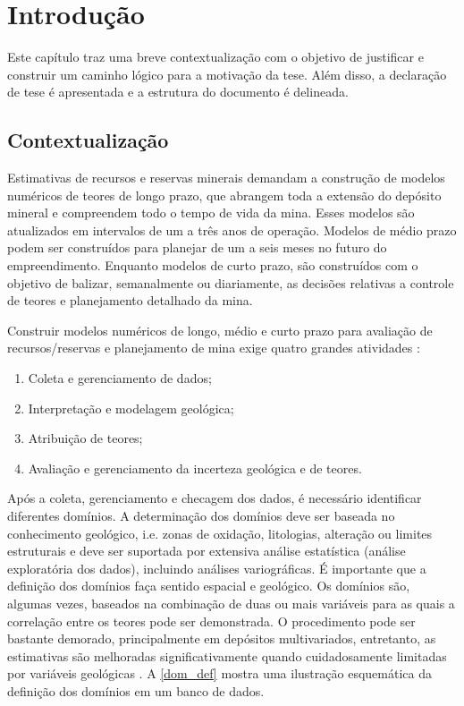 \chapter{Introdução}

Este capítulo traz uma breve contextualização com o objetivo de justificar e construir um caminho lógico para a motivação da tese. Além disso, a declaração de tese é apresentada e a estrutura do documento é delineada.

\section{Contextualização}

Estimativas de recursos e reservas minerais demandam a construção de modelos numéricos de teores de longo prazo, que abrangem toda a extensão do depósito mineral e compreendem todo o tempo de vida da mina. Esses modelos são atualizados em intervalos de um a três anos de operação. Modelos de médio prazo podem ser construídos para planejar de um a seis meses no futuro do empreendimento. Enquanto modelos de curto prazo, são construídos com o objetivo de balizar, semanalmente ou diariamente, as decisões relativas a controle de teores e planejamento detalhado da mina.

Construir modelos numéricos de longo, médio e curto prazo para avaliação de recursos/reservas e planejamento de mina exige quatro grandes atividades \cite{rossi2013mineral}:

\begin{enumerate}[label=\roman*]
\item Coleta e gerenciamento de dados;
\item Interpretação e modelagem geológica;
\item Atribuição de teores;
\item Avaliação e gerenciamento da incerteza geológica e de teores.
\end{enumerate}

Após a coleta, gerenciamento e checagem dos dados, é necessário identificar diferentes domínios. A determinação dos domínios deve ser baseada no conhecimento geológico, i.e. zonas de oxidação, litologias, alteração ou limites estruturais e deve ser suportada por extensiva análise estatística (análise exploratória dos dados), incluindo análises variográficas. É importante que a definição dos domínios faça sentido espacial e geológico. Os domínios são, algumas vezes, baseados na combinação de duas ou mais variáveis para as quais a correlação entre os teores pode ser demonstrada. O procedimento pode ser bastante demorado, principalmente em depósitos multivariados, entretanto, as estimativas são melhoradas significativamente quando cuidadosamente limitadas por variáveis geológicas \cite{rossi2013mineral}. A \autoref{dom_def} mostra uma ilustração esquemática da definição dos domínios em um banco de dados.

